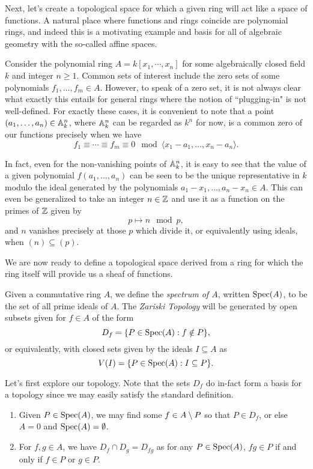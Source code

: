 \documentclass[12pt]{article}
\begin{document}
Next, let's create a topological space for which a given ring will act like a space of functions.
A natural place where functions and rings coincide are polynomial rings,
and indeed this is a motivating example and basis for all of algebraic geometry with the so-called affine spaces.

Consider the polynomial ring $A = k[x_1, \cdots, x_n]$ for some algebraically closed field $k$ and integer $n \geq 1$.
Common sets of interest include the zero sets of some polynomials $f_1, \ldots, f_m \in A$.
However, to speak of a zero set, it is not always clear what exactly this entails for general rings where the notion of ``plugging-in" is not well-defined.
For exactly these cases, it is convenient to note that a point ${(a_1, \ldots, a_n) \in \mathbb{A}_k^n}$,
where $\mathbb{A}_k^n$ can be regarded as $k^n$ for now,
is a common zero of our functions precisely when we have
\[
    f_1 \equiv \cdots \equiv f_m \equiv 0  \mod \langle x_1 - a_1, \ldots, x_n - a_n \rangle.
\]

In fact, even for the non-vanishing points of $\mathbb{A}_k^n$, 
it is easy to see that the value of a given polynomial $f(a_1, \ldots, a_n)$ can be seen to be the unique representative in $k$ modulo the ideal generated by the polynomials $a_1 - x_1, \ldots, a_n - x_n \in A$. 
This can even be generalized to take an integer $n \in \mathbb{Z}$ and use it as a function on the primes of $\mathbb{Z}$ given by
\[
    p \mapsto n \mod p,
\]
and $n$ vanishes precisely at those $p$ which divide it,
or equivalently using ideals, when ${(n) \subseteq (p)}$. 

We are now ready to define a topological space derived from a ring for which the ring itself will provide us a sheaf of functions.

\begin{definition}
    Given a commutative ring $A$, we define the \textit{spectrum of $A$}, written ${\rm Spec}(A)$, to be the set of all prime ideals of $A$.
    The \textit{Zariski Topology} will be generated by open subsets given for $f \in A$ of the form
    \[
        D_f = \{ P \in {\rm Spec}(A) : f \notin P \},
    \]
    or equivalently, with closed sets given by the ideals $I \subseteq A$ as
    \[
        V(I) = \{ P \in {\rm Spec}(A) : I \subseteq P \}.
    \]
\end{definition}

Let's first explore our topology.
Note that the sets $D_f$ do in-fact form a basis for a topology since we may easily satisfy the standard definition.
\begin{enumerate}
    \item Given $P \in {\rm Spec}(A)$, 
    we may find some $f \in A \setminus P$ so that $P \in D_f$, 
    or else $A = 0$ and ${\rm Spec}(A) = \emptyset$.
    \item For $f, g \in A$, we have $D_f \cap D_g = D_{f g}$ as for any $P \in {\rm Spec}(A)$, 
    $f g \in P$ if and only if $f \in P$ or $g \in P$.
\end{enumerate}
\end{document}
